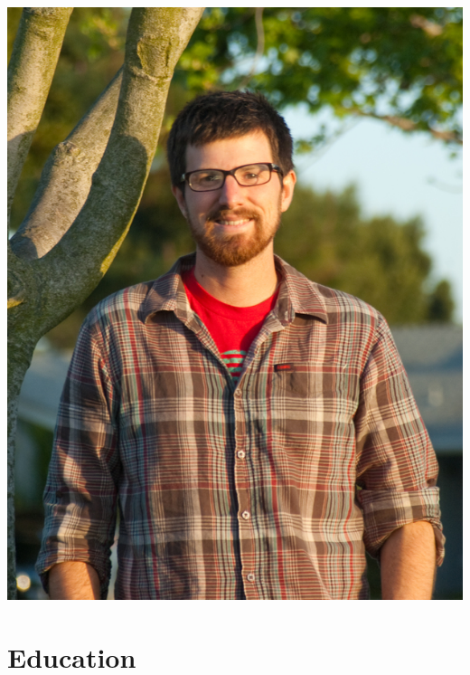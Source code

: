 


\thispagestyle{firstpagestyle}
\pagestyle{fancy}

\begin{center}
\vspace{10px}{\Large Patrick Sanan}\\
\end{center}
\vspace{10px}
\begin{minipage}{0.8\textwidth}

\end{minipage}
\begin{minipage}{0.19\textwidth}
  \includegraphics[width=\textwidth]{sanan_patrick_portrait_small.jpg}
\end{minipage}

\section*{Education}


